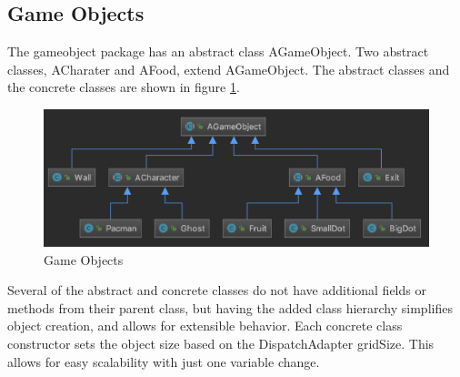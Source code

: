 \documentclass[letterpaper, 11pt]{article}
\begin{document}
\subsection{Game Objects}
The gameobject package has an abstract class AGameObject. Two abstract classes, ACharater and AFood, extend AGameObject. The abstract classes and the concrete classes are shown in figure \ref{fig1}. 

\begin{figure}[htbp] 
  \centering
  \includegraphics[width=.85\linewidth]{objects.png} 
  \caption{Game Objects}
  \label{fig1} 
\end{figure}

Several of the abstract and concrete classes do not have additional fields or methods from their parent class, but having the added class hierarchy simplifies object creation, and allows for extensible behavior. Each concrete class constructor sets the object size based on the DispatchAdapter gridSize. This allows for easy scalability with just one variable change. 
\end{document}
